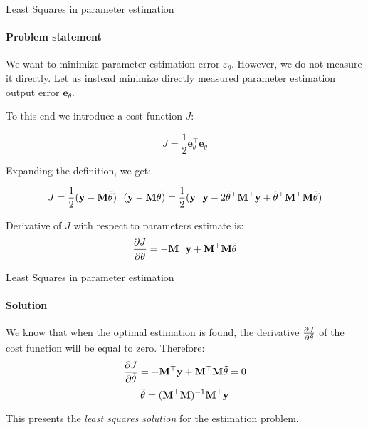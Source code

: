 \documentclass{beamer}
\begin{document}
\begin{frame}{Least Squares in parameter estimation}
\framesubtitle{Problem statement}
\begin{flushleft}

We want to minimize parameter estimation error $\varepsilon_{\theta}$. However, we do not measure it directly. Let us instead minimize directly measured parameter estimation output error $\mathbf e_{\theta}$. 

To this end we introduce a cost function $J$:

\[
J = \frac{1}{2} \mathbf e_{\theta}^\top \mathbf e_{\theta}
\]

Expanding the definition, we get:

\[
J = \frac{1}{2} (\mathbf y - \mathbf M \Tilde{\theta})^\top (\mathbf y - \mathbf M \Tilde{\theta}) = 
\frac{1}{2} (\mathbf y^\top \mathbf y - 
2 \Tilde{\theta}^\top \mathbf M^\top \mathbf y + 
\Tilde{\theta}^\top \mathbf M^\top \mathbf M \Tilde{\theta})
\]

Derivative of $J$ with respect to parameters estimate is:
\[
\frac{\partial J}{\partial \Tilde{\theta}} = 
-\mathbf M^\top \mathbf y + 
\mathbf M^\top \mathbf M \Tilde{\theta}
\]

\end{flushleft}
\end{frame}


\begin{frame}{Least Squares in parameter estimation}
\framesubtitle{Solution}
\begin{flushleft}

We know that when the optimal estimation is found, the derivative $\frac{\partial J}{\partial \Tilde{\theta}}$ of the cost function will be equal to zero. Therefore:
\[
\frac{\partial J}{\partial \Tilde{\theta}} = 
-\mathbf M^\top \mathbf y + 
\mathbf M^\top \mathbf M \Tilde{\theta} = 0
\]
\[
 \Tilde{\theta} = (\mathbf M^\top \mathbf M)^{-1} \mathbf M^\top \mathbf y
\]

This presents the \emph{least squares solution} for the estimation problem.

\end{flushleft}
\end{frame}
\end{document}
